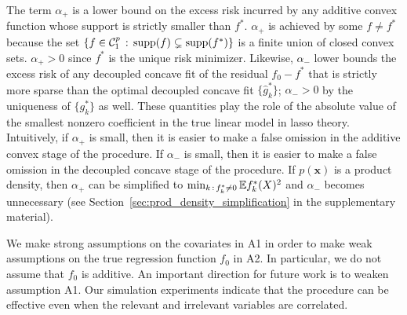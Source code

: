 The term $\alpha_+$ is a lower bound on the excess risk incurred by
any additive convex function whose support is strictly smaller than
$f^*$. $\alpha_+$ is achieved by some $f \neq f^*$ because the set
$\{f\in \mathcal{C}_1^p\,:\, \textrm{supp}(f) \subsetneq
\textrm{supp}(f^*)\}$ is a finite union of closed convex
sets. $\alpha_+ > 0$ since $f^*$ is the unique risk
minimizer. Likewise, $\alpha_-$ lower bounds the excess risk of any
decoupled concave fit of the residual $f_0 - f^*$ that is strictly
more sparse than the optimal decoupled concave fit $\{\hat{g}_k^*\}$;
$\alpha_- > 0$ by the uniqueness of $\{g^*_k\}$ as well. These
quantities play the role of the absolute value of the smallest nonzero
coefficient in the true linear model in lasso theory.  Intuitively, if
$\alpha_{+}$ is small, then it is easier to make a false omission in
the additive convex stage of the procedure. If $\alpha_{-}$ is small,
then it is easier to make a false omission in the decoupled concave
stage of the procedure. If $p(\mathbf{x})$ is a product density, then $\alpha_+$ can be
simplified to $\min_{k \,:\, f^*_k \neq 0} {\mathbb E} f^*_k(X)^2$ and
$\alpha_-$ becomes unnecessary (see Section~\ref{sec:prod_density_simplification} in the supplementary material). 

\begin{remark}
  We make strong assumptions on the covariates in A1 in order to make
  weak assumptions on the true regression function $f_0$ in
  A2. In particular, we do not assume that $f_0$ is additive. An
  important direction for future work is to weaken assumption A1.
  Our simulation experiments indicate that the procedure can be
  effective even when the relevant and irrelevant variables are correlated.
\end{remark}


